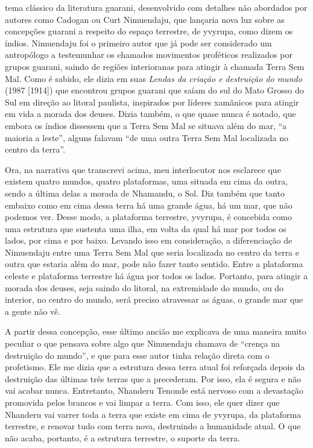 tema clássico da literatura guarani, desenvolvido com detalhes não
abordados por autores como Cadogan ou Curt Nimuendaju, que lançaria
nova luz sobre as concepções guarani a respeito do espaço terrestre, de
yvyrupa, como dizem os índios. Nimuendaju foi o primeiro autor que já
pode ser considerado um antropólogo a testemunhar os chamados
movimentos proféticos realizados por grupos guarani, saindo de regiões
interioranas para atingir à chamada Terra Sem Mal. Como é sabido, ele
dizia em suas \emph{Lendas da criação e destruição do mundo} (1987 [1914]) que
encontrou grupos guarani que saíam do sul do Mato Grosso do Sul em
direção ao litoral paulista, inspirados por líderes xamânicos para
atingir em vida a morada dos deuses. Dizia também, o que quase nunca é
notado, que embora os índios dissessem que a Terra Sem Mal se situava
além do mar, ``a maioria a leste'', alguns falavam ``de uma outra Terra
Sem Mal localizada no centro da terra''.

Ora, na narrativa que transcrevi acima, meu interlocutor nos esclarece
que existem quatro mundos, quatro plataformas, uma situada em cima da
outra, sendo a última delas a morada de Nhamandu, o Sol. Diz também que
tanto embaixo como em cima dessa terra há uma grande água, há um mar,
que não podemos ver. Desse modo, a plataforma terrestre, yvyrupa, é
concebida como uma estrutura que sustenta uma ilha, em volta da qual há
mar por todos os lados, por cima e por baixo. Levando isso em
consideração, a diferenciação de Nimuendaju entre uma Terra Sem Mal que
seria localizada no centro da terra e outra que estaria além do mar,
pode não fazer tanto sentido. Entre a plataforma celeste e plataforma
terrestre há água por todos os lados. Portanto, para atingir a morada
dos deuses, seja saindo do litoral, na extremidade do mundo, ou do
interior, no centro do mundo, será preciso atravessar as águas, o
grande mar que a gente não vê.

A partir dessa concepção, esse último ancião me explicava de uma maneira
muito peculiar o que pensava sobre algo que Nimuendaju chamava de
``crença na destruição do mundo'', e que para esse autor tinha relação
direta com o profetismo. Ele me dizia que a estrutura dessa terra atual
foi reforçada depois da destruição das últimas três terras que a
precederam. Por isso, ela é segura e não vai acabar nunca. Entretanto,
Nhanderu Tenonde está nervoso com a devastação promovida pelos brancos
e vai limpar a terra. Com isso, ele quer dizer que Nhanderu vai varrer
toda a terra que existe em cima de yvyrupa, da plataforma terrestre, e
renovar tudo com terra nova, destruindo a humanidade atual. O que não
acaba, portanto, é a estrutura terrestre, o suporte da terra. 

